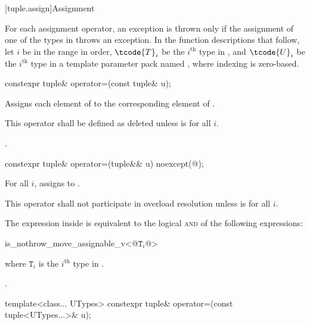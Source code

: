 [tuple.assign]{Assignment}

\pnum
For each  assignment operator, an exception is thrown only if the
assignment of one of the types in  throws an exception.
In the function descriptions that follow, let $i$ be in the range 
in order, $\tcode{T}_i$ be the $i^\text{th}$ type in ,
and $\tcode{U}_i$ be the $i^\text{th}$ type in a
template parameter pack named , where indexing is zero-based.

%
\begin{itemdecl}
constexpr tuple& operator=(const tuple& u);
\end{itemdecl}

\begin{itemdescr}
\pnum
\effects
Assigns each element of  to the corresponding
element of .

\pnum
\remarks
This operator shall be defined as deleted unless
 is  for all $i$.

\pnum
\returns
{}.
\end{itemdescr}

%
\begin{itemdecl}
constexpr tuple& operator=(tuple&& u) noexcept(@\seebelow@);
\end{itemdecl}

\begin{itemdescr}
\pnum
\effects
For all $i$, assigns  to
.

\pnum
\remarks
This operator shall not participate in overload resolution unless
 is  for all $i$.

\pnum
\remarks
The expression inside  is equivalent to the logical \textsc{and} of the
following expressions:

\begin{codeblock}
is_nothrow_move_assignable_v<@$\mathtt{T}_i$@>
\end{codeblock}
where $\mathtt{T}_i$ is the $i^\text{th}$ type in .

\pnum
\returns
{}.
\end{itemdescr}

%
\begin{itemdecl}
template<class... UTypes> constexpr tuple& operator=(const tuple<UTypes...>& u);
\end{itemdecl}

